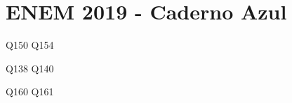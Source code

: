 \chapter{ENEM 2019 - Caderno Azul}

\setlength{\columnseprule}{0.5pt}
\setlength{\columnsep}{30pt}
\def\columnseprulecolor{\color{mygray}}
%
\begin{multicols}{2}
{Q150}
{Q154}

{Q138}
{Q140}

{Q160}
{Q161}


    
\end{multicols}



